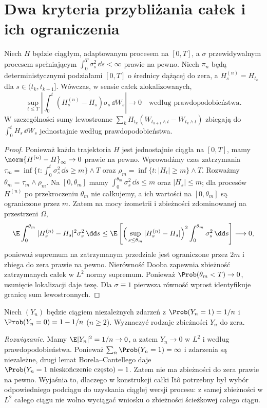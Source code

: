\section{Dwa kryteria przybliżania całek i ich ograniczenia}
\begin{lemat}
\label{lem:step-approx-ito}
Niech $H$ będzie ciągłym, adaptowanym procesem na
$[0,T]$, a $\sigma$ przewidywalnym procesem spełniającym
$\int_0^T\sigma_s^2\,\dd s<\infty$ prawie na pewno.
Niech $\pi_n$ będą deterministycznymi podziałami
$[0,T]$ o średnicy dążącej do zera, a
$H_s^{(n)}=H_{t_k}$ dla $s\in(t_k,t_{k+1}]$.
Wówczas, w sensie całek zlokalizowanych,
\[
\sup_{t\le T}\left|
\int_0^t(H_s^{(n)}-H_s)\sigma_s\,\dd W_s\right|
\longrightarrow0\quad\text{według prawdopodobieństwa}.
\]
W szczególności sumy lewostronne
$\sum_kH_{t_k}(W_{t_{k+1}\wedge t}-W_{t_k\wedge t})$
zbiegają do $\int_0^tH_s\,\dd W_s$ jednostajnie
według prawdopodobieństwa.
\end{lemat}
\begin{proof}
Ponieważ każda trajektoria $H$ jest jednostajnie
ciągła na $[0,T]$, mamy
$\norm{H^{(n)}-H}_\infty\to0$ prawie na pewno.
Wprowadźmy czas zatrzymania
$\tau_m=\inf\{t:\int_0^t\sigma_s^2\,\dd s\ge m\}
\wedge T$ oraz $\rho_m=\inf\{t:|H_t|\ge m\}\wedge T$.
Rozważmy $\theta_m=\tau_m\wedge\rho_m$.
Na $[0,\theta_m]$ mamy
$\int_0^{\theta_m}\sigma_s^2\,\dd s\le m$ oraz
$|H_s|\le m$; dla procesów $H^{(n)}$ po przekroczeniu
$\theta_m$ nie całkujemy, a ich wartości na
$[0,\theta_m]$ są ograniczone przez $m$.
Zatem na mocy izometrii i zbieżności zdominowanej
na przestrzeni $\Omega$,
\[
\E\int_0^{\theta_m}|H_s^{(n)}-H_s|^2
\sigma_s^2\,\dd s
\le \E\left[
\Big(\sup_{s\le\theta_m}|H_s^{(n)}-H_s|\Big)^2
\int_0^{\theta_m}\sigma_s^2\,\dd s\right]\longrightarrow0,
\]
ponieważ supremum na zatrzymanym przedziale jest
ograniczone przez $2m$ i zbiega do zera prawie na pewno.
Nierówność Dooba zapewnia
zbieżność zatrzymanych całek w $L^2$ normy supremum.
Ponieważ $\Prob(\theta_m<T)\to0$, usunięcie
lokalizacji daje tezę. Dla $\sigma\equiv1$
pierwsza równość wprost identyfikuje granicę
sum lewostronnych.
\end{proof}

\begin{zadanie}
Niech $(Y_n)$ będzie ciągiem niezależnych zdarzeń
z $\Prob(Y_n=1)=1/n$ i $\Prob(Y_n=0)=1-1/n$
($n\ge2$). Wyznaczyć rodzaje zbieżności $Y_n$ do zera.

\emph{Rozwiązanie.} Mamy $\E|Y_n|^2=1/n\to0$,
a zatem $Y_n\to0$ w $L^2$ i według prawdopodobieństwa.
Ponieważ $\sum_n\Prob(Y_n=1)=\infty$ i zdarzenia są
niezależne, drugi lemat Borela--Cantellego daje
$\Prob(Y_n=1\ \text{nieskończenie często})=1$.
Zatem nie ma zbieżności do zera prawie na pewno.
Wyjaśnia to, dlaczego w konstrukcji całki Itô potrzebny
był wybór odpowiedniego podciągu do uzyskania ciągłej
wersji procesu: z samej zbieżności w $L^2$ całego
ciągu nie wolno wyciągać wniosku o zbieżności
ścieżkowej całego ciągu.
\end{zadanie}


